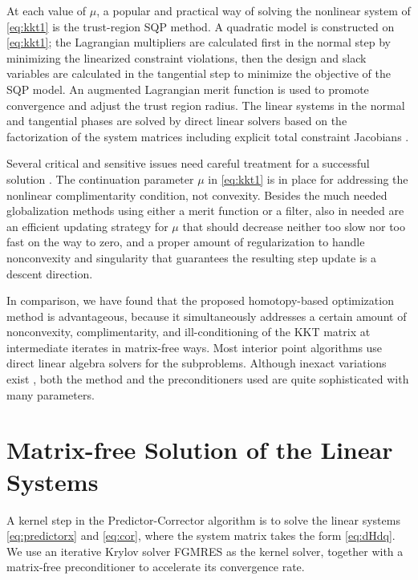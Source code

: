 \documentclass{article}
\theoremstyle{definition}
\begin{document}
At each value of $\mu$, a popular and practical way of solving the nonlinear system of \eqref{eq:kkt1} is the trust-region SQP method. A quadratic model is constructed on \eqref{eq:kkt1}; the Lagrangian multipliers are calculated first in the normal step by minimizing the linearized constraint violations, then the design and slack variables are calculated in the tangential step to minimize the objective of the SQP model. An augmented Lagrangian merit function is used to promote convergence and adjust the trust region radius. The linear systems in the normal and tangential phases are solved by direct linear solvers based on the factorization of the system matrices including explicit total constraint Jacobians \cite{Byrd:1999:IPA:588897.589167}.  
 

Several critical and sensitive issues need careful treatment for a successful solution \cite{Nocedal2006NO}. The continuation parameter $\mu$ in \eqref{eq:kkt1} is in place for addressing the nonlinear complimentarity condition, not convexity. Besides the much needed globalization methods using either a merit function or a filter, also in needed are an efficient updating strategy for $\mu$ that should decrease neither too slow nor too fast on the way to zero, and a proper amount of regularization to handle nonconvexity and singularity that guarantees the resulting step update is a descent direction. 

In comparison, we have found that the proposed homotopy-based optimization method is advantageous, because it simultaneously addresses a certain amount of nonconvexity, complimentarity, and ill-conditioning of the KKT matrix at intermediate iterates in matrix-free ways. Most interior point algorithms use direct linear algebra solvers for the subproblems. Although inexact variations exist \cite{Gondzio2012}, both the method and the preconditioners used are quite sophisticated with many parameters.

\section{Matrix-free Solution of the Linear Systems}
A kernel step in the Predictor-Corrector algorithm is to solve the linear systems \eqref{eq:predictorx} and \eqref{eq:cor}, where the system matrix takes the form \eqref{eq:dHdq}. We use an iterative Krylov solver FGMRES as the kernel solver, together with a matrix-free preconditioner to accelerate its convergence rate. 
\end{document}
